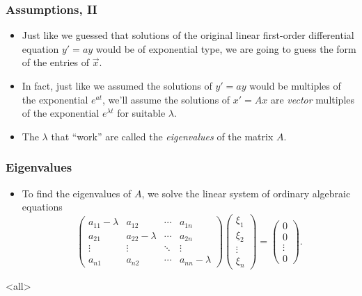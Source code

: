 \begin{frame}

\frametitle{Assumptions, II}
\label{assumptionsii}

\begin{itemize}
\item Just like we guessed that solutions of the original linear first-order differential equation $ y' = ay $ would be of exponential type, we are going to guess the form of the entries of $ \vec{x} $.

\item In fact, just like we assumed the solutions of $ y' = ay $ would be multiples of the exponential $ e^{at} $, we'll assume the solutions of $ x' = Ax $ are \emph{vector} multiples of the exponential $ e^{\lambda t} $ for suitable $ \lambda $.

\item The $ \lambda $ that ``work'' are called the \emph{eigenvalues} of the matrix $ A $.

\end{itemize}

\end{frame}

\begin{frame}

\frametitle{Eigenvalues}
\label{eigenvalues}

\begin{itemize}
\item To find the eigenvalues of $ A $, we solve the linear system of ordinary algebraic equations
\[
\begin{pmatrix}
    a_{11} - \lambda & a_{12} & \cdots & a_{1n} \\
    a_{21} & a_{22} - \lambda & \cdots & a_{2n} \\
    \vdots & \vdots & \ddots & \vdots \\
    a_{n1} & a_{n2} & \cdots & a_{nn} - \lambda
\end{pmatrix} \begin{pmatrix}
    \xi_1 \\ \xi_2 \\ \vdots \\ \xi_n
\end{pmatrix} = \begin{pmatrix}
    0 \\ 0 \\ \vdots \\ 0
\end{pmatrix}.
\]

\end{itemize}

\end{frame}

\mode<all>


\mode*


